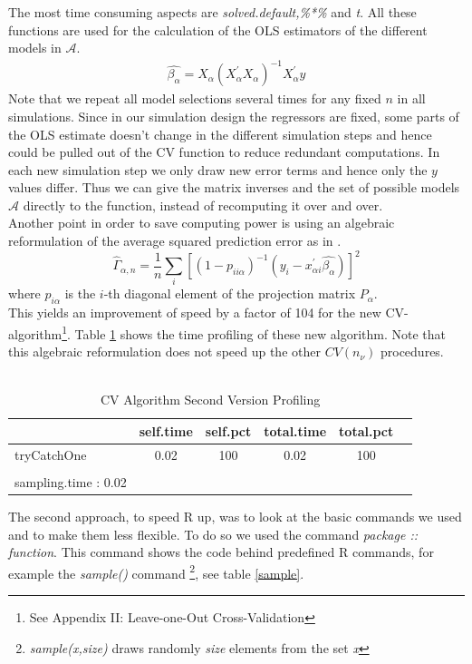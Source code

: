 \documentclass[Research_Module_ES.tex]{subfiles}
\begin{document}
The most time consuming aspects are {\itshape solved.default,\%*\%} and {\itshape t}. All these functions are used for the calculation of the OLS estimators of the different models in $\mathcal{A}$.
\begin{align*}
\hat{\beta_\alpha}=X_\alpha(X^\prime_\alpha X_\alpha)^{-1}X_\alpha^\prime y
\end{align*}
Note that we repeat all model selections several times for any fixed $n$ in all simulations. Since in our simulation design the regressors are fixed, some parts of the OLS estimate doesn't change in the different simulation steps and hence could be pulled out of the CV function to reduce redundant computations. In each new simulation step we only draw new error terms and hence only the $y$ values differ. Thus we can give the matrix inverses and the set of possible models $\mathcal{A}$ directly to the function, instead of recomputing it over and over.
\\
Another point in order to save computing power is using an algebraic reformulation of the average squared prediction error as in \cite{shao}.
\[
	\hat{\Gamma}_{\alpha,n}=\frac{1}{n}\sum_i[(1-p_{ii\alpha})^{-1}(y_i-x^\prime_{\alpha i}\hat{\beta_\alpha})]^2
\]
where $p_{i\alpha}$ is the $i$-th diagonal element of the projection matrix $P_\alpha$.\\
This yields an improvement of speed by a factor of 104 for the new CV-algorithm\footnote{See Appendix II: Leave-one-Out Cross-Validation}. Table \ref{CVneu} shows the time profiling of these new algorithm. Note that this algebraic reformulation does not speed up the other $CV(n_\nu)$ procedures.\\
\\
\begin{table}[!h]
	\caption{CV Algorithm Second Version Profiling }
	\label{CVneu}
	\centering
	\begin{tabular}{lccccc}
		\toprule
		\midrule
		\textbf{\scriptsize }
		&\textbf{\scriptsize self.time}
		&\textbf{\scriptsize self.pct}
		&\textbf{\scriptsize total.time}
		&\textbf{\scriptsize total.pct}
		\\\midrule\midrule
		\scriptsize tryCatchOne & \scriptsize 0.02 & \scriptsize 100 &\scriptsize 0.02 & \scriptsize 100 \\
		\\
		\scriptsize sampling.time : 0.02
	\end{tabular}
\end{table}
The second approach, to speed R up,  was to look at the basic commands we used and to make them less flexible. To do so we used the command {\itshape package :: function}. This command shows the code behind predefined R commands, for example the {\itshape sample()} command \footnote{{\itshape sample(x,size)} draws randomly {\itshape size} elements from the set {\itshape x} }, see table \ref{sample}.
\end{document}
